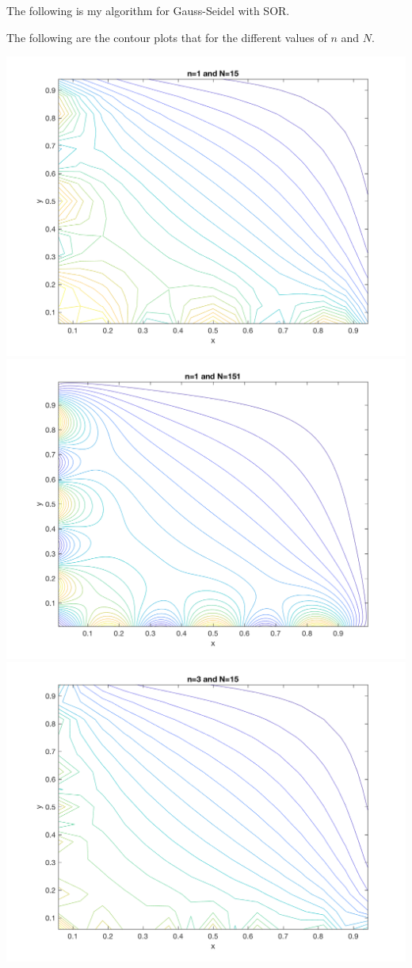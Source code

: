 \documentclass[11pt, oneside]{article}
\begin{document}
\begin{enumerate}
    The following is my algorithm for Gauss-Seidel with SOR.
    
    The following are the contour plots that for the different values of $n$ and
    $N$.
    \begin{center}
      \includegraphics[scale=0.4]{Figures/05_1.png}
      \includegraphics[scale=0.4]{Figures/05_2.png}
      \includegraphics[scale=0.4]{Figures/05_3.png}

\end{center}
\end{enumerate}
\end{document}
